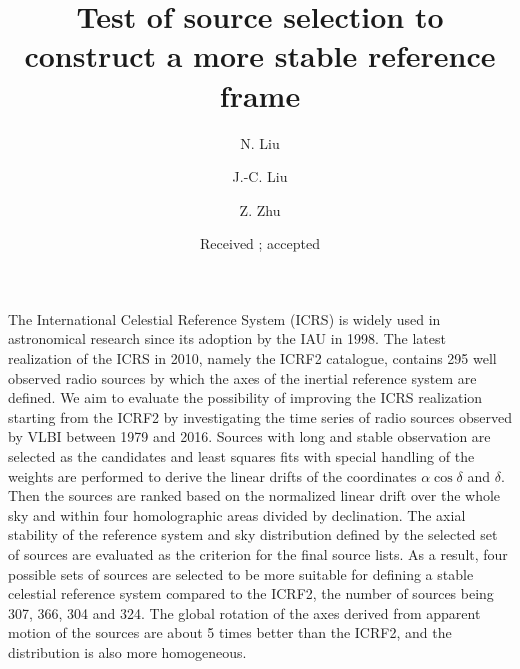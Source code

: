 \documentclass{aa}
\begin{document}
   \title{Test of source selection to construct a more stable reference frame}

   \author{N. Liu
          \and
          J.-C. Liu
          \and
          Z. Zhu}


   \date{Received ; accepted }

  \abstract
   {The International Celestial Reference System (ICRS) is widely used in astronomical research since its adoption by the IAU in 1998. The latest realization of the ICRS in 2010, namely the ICRF2 catalogue, contains 295 well observed radio sources by which the axes of the inertial reference system are defined.}
   {We aim to evaluate the possibility of improving the ICRS realization starting from the ICRF2 by investigating the time series of radio sources observed by VLBI between 1979 and 2016.}
   {Sources with long and stable observation are selected as the candidates and least squares fits with special handling of the weights are performed to derive the linear drifts of the coordinates $\alpha\cos\delta$ and $\delta$. Then the sources are ranked based on the normalized linear drift over the whole sky and within four homolographic areas divided by declination. The axial stability of the reference system and sky distribution defined by the selected set of sources are evaluated as the criterion for the final source lists.}
   {As a result, four possible sets of sources are selected to be more suitable for defining a stable celestial reference system compared to the ICRF2, the number of sources being 307, 366, 304 and 324. The global rotation of the axes derived from apparent motion of the sources are about 5 times better than the ICRF2, and the distribution is also more homogeneous.}
   {}


   \maketitle
\end{document}
